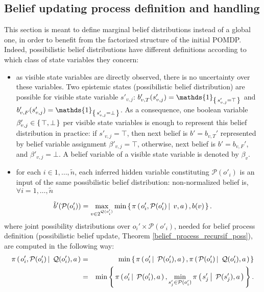 \subsection{Belief updating process definition and handling}
This section is meant to define marginal belief distributions instead of a global one,
in order to benefit from the factorized structure of the initial POMDP. Indeed,
possibilistic belief distributions have different definitions according to which class of state variables they concern:
\begin{itemize}
\item as visible state variables are directly observed, there is no uncertainty over
 these variables. Two epistemic states (possibilistic belief distribution) 
are possible for visible state variable 
$s'_{v,j}$: 
$b_{v,T}'(s'_{v,j}) = \mathds{1}_{ \set{s'_{v,j}=\top}}$ and 
$b_{v,F}'(s'_{v,j}) = \mathds{1}_{\set{s'_{v,j}=\bot}}$. As a consequence, one boolean variable 
$\beta_{v,j}' \in \left\{ \left.  \top, \bot  \right. \right\}$ per visible state variables is enough to represent this 
belief distribution in practice: if $s'_{v,j}=\top$, then next belief is $b'=b_{v,T}'$ represented 
by belief variable assignment $\beta'_{v,j} = \top$, otherwise, next belief is $b'=b_{v,F}'$, and $\beta'_{v,j} = \bot$.
A belief variable of a visible state variable is denoted by $\beta_v$.
\item for each $i \in 1,\ldots,\tilde{n}$, each inferred hidden variable constituting 
$\mathcal{P}(o'_i)$ is an input of the same possibilistic belief distribution: 
non-normalized belief is, $\forall i=1,\ldots,\tilde{n}$
\end{itemize}
\begin{equation}
\label{inferredBel}
\tilde{b}'(\mathcal{P}(o_i')) = \max_{v \in 2^{\mathcal{Q}(o_i')}} \min \left\{ \left.  \pi \left( \left.  o_i', \mathcal{P}(o_i') \, \right| \left. \, v,a \right. \right), b(v)  \right. \right\}.
\end{equation}
where joint possibility distributions over $o_i' \times \mathcal{P}(o'_i)$, 
needed for belief process definition (possibilistic belief update, Theorem \ref{belief_process_recursif_poss}), 
are computed in the following way:
\begin{eqnarray*}
\pi \left( \left.  o_i', \mathcal{P}(o'_i) \, \right| \left. \, \mathcal{Q}(o'_i), a  \right. \right) & = & \min \left\{ \left.  \pi \left( \left.  o_i' \, \right| \left. \, \mathcal{P}(o'_i), a \right. \right), \pi \left( \left.  \mathcal{P}(o'_i) \, \right| \left. \, \mathcal{Q}(o'_i), a   \right. \right)  \right. \right\} \\
& = & \min \left\{ \left.  \pi \left( \left.  o_i' \, \right| \left. \, \mathcal{P}(o'_i), a \right. \right), \min_{s'_j \in \mathcal{P}(o'_i)} \pi \left( \left.  s'_j \, \right| \left. \, \mathcal{P}(s'_j), a   \right. \right)  \right. \right\}.
\end{eqnarray*}


